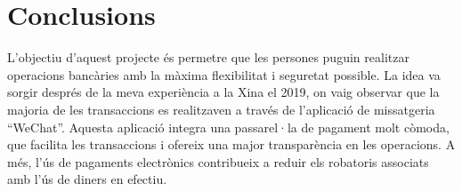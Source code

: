\documentclass[a4paper,12pt,twoside]{ThesisStyle}
\begin{document}





\chapter{Conclusions}
\label{chp:conclusions}


L'objectiu d'aquest projecte és permetre que les persones puguin realitzar operacions bancàries amb la màxima flexibilitat i seguretat possible. La idea va sorgir després de la meva experiència a la Xina el 2019, on vaig observar que la majoria de les transaccions es realitzaven a través de l'aplicació de missatgeria ``WeChat''. Aquesta aplicació integra una passarel·la de pagament molt còmoda, que facilita les transaccions i ofereix una major transparència en les operacions. A més, l'ús de pagaments electrònics contribueix a reduir els robatoris associats amb l'ús de diners en efectiu.\\
\end{document}
